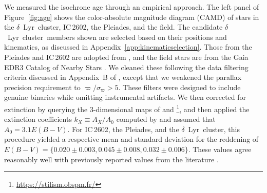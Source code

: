 \documentclass[12pt,modern,twocolumn,tighten]{aastex63}
\newcommand{\cn}{$\delta$\ Lyr\ cluster} %
\begin{document}
We measured the isochrone age through an empirical approach.  The left
panel of Figure~\ref{fig:age} shows the color-absolute magnitude
diagram (CAMD)
of stars in the \cn, IC\,2602, the Pleiades, and the field.  The
candidate \cn\ members shown are
selected based on their positions and
kinematics, as discussed in Appendix~\ref{app:kinematicselection}.
Those from the Pleiades and IC\,2602 are adopted from
\citet{cantatgaudin_gaia_2018}, and the field stars are from the Gaia
EDR3 Catalog of Nearby Stars \citep{gaia_gcns_2021}.  We cleaned these
following the data filtering criteria discussed in Appendix~B of
\citet{GaiaCollaboration2018}, except that we weakened the parallax
precision requirement to $\varpi/\sigma_\varpi>5$.  These filters were
designed to include genuine binaries while omitting instrumental
artifacts.  We then corrected for extinction by querying the
3-dimensional maps of \citet{capitanio_threedimensional_2017} and
\citet{lallement_threedimensional_2018}\footnote{\url{https://stilism.obspm.fr/}},
and then applied the extinction coefficients $k_X\equiv A_X/A_0$
computed by \citet{GaiaCollaboration2018} and assumed that $A_0 =
3.1 E(B-V)$.  For IC\,2602, the Pleiades, and the \cn, this procedure
yielded a respective mean and standard deviation for the reddening of
$E(B-V)=\{0.020\pm0.003, 0.045\pm0.008, 0.032\pm0.006\}$.  These
values agree reasonably well with previously reported values from the
literature \citep[{\it
e.g.},][]{GaiaCollaboration2018,kounkel_untangling_2019,bossini_age_2019}.

%
%
%
\end{document}
